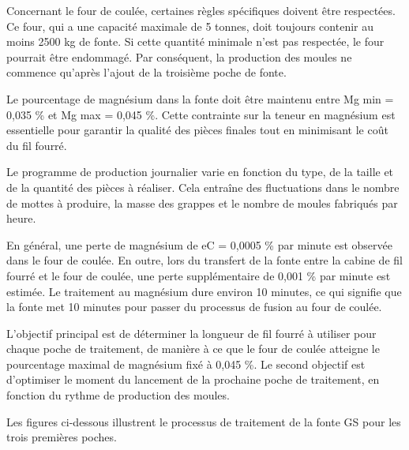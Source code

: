 \documentclass[12pt]{article}
\begin{document}
Concernant le four de coulée, certaines règles spécifiques doivent être 
respectées. Ce four, qui a une capacité maximale de 5 tonnes, doit 
toujours contenir au moins 2500 kg de fonte. Si cette quantité minimale 
n'est pas respectée, le four pourrait être endommagé. Par conséquent, 
la production des moules ne commence qu'après l'ajout de la troisième 
poche de fonte.

Le pourcentage de magnésium dans la fonte doit être maintenu 
entre Mg min = 0,035 \% et Mg max = 0,045 \%. 
Cette contrainte sur la teneur en magnésium 
est essentielle pour garantir la qualité des pièces finales tout en 
minimisant le coût du fil fourré.

Le programme de production journalier varie en fonction du type, de la 
taille et de la quantité des pièces à réaliser. Cela entraîne des 
fluctuations dans le nombre de mottes à produire, la masse des grappes 
et le nombre de moules fabriqués par heure.

En général, une perte de magnésium de eC = 0,0005 \% par minute est 
observée dans le four de coulée. En outre, lors du transfert de la fonte entre 
la cabine de fil fourré et le four de coulée, une perte supplémentaire 
de 0,001 \% par minute est estimée. Le traitement au magnésium dure 
environ 10 minutes, ce qui signifie que la fonte met 10 minutes pour 
passer du processus de fusion au four de coulée.

L'objectif principal est de déterminer la longueur de fil fourré à 
utiliser pour chaque poche de traitement, de manière à ce que le four 
de coulée atteigne le pourcentage maximal de magnésium fixé à 0,045 \%. 
Le second objectif est d'optimiser le moment du lancement de la prochaine 
poche de traitement, en fonction du rythme de production des moules.

Les figures ci-dessous illustrent le processus de traitement de la fonte 
GS pour les trois premières poches.


\end{document}
